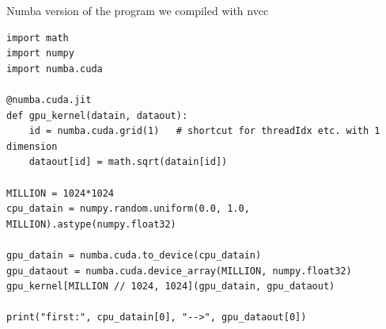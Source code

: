 \documentclass[aspectratio=169]{beamer}
\begin{document}








\begin{frame}[fragile]{Numba version of the program we compiled with nvcc}
\vspace{0.1 cm}
\scriptsize
\begin{verbatim}
import math
import numpy
import numba.cuda

@numba.cuda.jit
def gpu_kernel(datain, dataout):
    id = numba.cuda.grid(1)   # shortcut for threadIdx etc. with 1 dimension
    dataout[id] = math.sqrt(datain[id])

MILLION = 1024*1024
cpu_datain = numpy.random.uniform(0.0, 1.0, MILLION).astype(numpy.float32)

gpu_datain = numba.cuda.to_device(cpu_datain)
gpu_dataout = numba.cuda.device_array(MILLION, numpy.float32)
gpu_kernel[MILLION // 1024, 1024](gpu_datain, gpu_dataout)

print("first:", cpu_datain[0], "-->", gpu_dataout[0])
\end{verbatim}
\end{frame}
\end{document}
